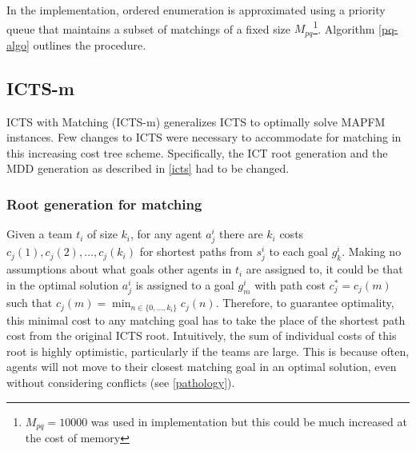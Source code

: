 \documentclass[english]{article}
\begin{document}
	In the implementation, ordered enumeration is approximated using a priority queue that maintains a subset of matchings of a fixed size $M_{pq}$\footnote{$M_{pq} = 10000$ was used in implementation but this could be much increased at the cost of memory}. Algorithm \ref{pq-algo} outlines the procedure.
	
	\subsection{ICTS-m}
	ICTS with Matching (ICTS-m) generalizes ICTS to optimally solve MAPFM instances. Few changes to ICTS were necessary to accommodate for matching in this increasing cost tree scheme. Specifically, the ICT root generation and the MDD generation as described in \ref{icts} had to be changed.
	\subsubsection{Root generation for matching}
	Given a team $t_i$ of size $k_i$, for any agent $a_j^i$ there are $k_i$ costs $c_j(1),c_j(2),\ldots,c_j(k_i)$ for shortest paths from $s_j^i$ to each goal $g_k^i$. Making no assumptions about what goals other agents in $t_i$ are assigned to, it could be that in the optimal solution $a_j^i$ is assigned to a goal $g_{m}^i$ with path cost $c^*_j = c_j(m)$ such that $c_j(m) = \min_{n\in\{0,\ldots,k_i\}} c_j(n)$. Therefore, to guarantee optimality, this minimal cost to any matching goal has to take the place of the shortest path cost from the original ICTS root. Intuitively, the sum of individual costs of this root is highly optimistic, particularly if the teams are large. This is because often, agents will not move to their closest matching goal in an optimal solution, even without considering conflicts (see \ref{pathology}).
	
\end{document}
